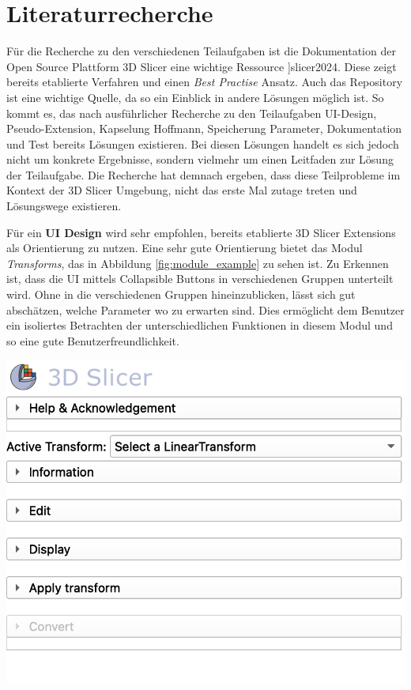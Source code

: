 \section{Literaturrecherche}
\label{sec:recherche} Für die Recherche zu den verschiedenen Teilaufgaben ist
die Dokumentation der Open Source Plattform 3D Slicer eine wichtige Ressource
\cite[vgl.]{[}]{slicer2024}. Diese zeigt bereits etablierte Verfahren und einen \textit{Best
Practise} Ansatz. Auch das \citet{extensionsIndex2024} Repository ist eine
wichtige Quelle, da so ein Einblick in andere Lösungen möglich ist. So kommt es,
das nach ausführlicher Recherche zu den Teilaufgaben UI-Design, Pseudo-Extension,
Kapselung Hoffmann, Speicherung Parameter, Dokumentation und Test bereits Lösungen
existieren. Bei diesen Lösungen handelt es sich jedoch nicht um konkrete
Ergebnisse, sondern vielmehr um einen Leitfaden zur Lösung der Teilaufgabe. Die
Recherche hat demnach ergeben, dass diese Teilprobleme im Kontext der 3D Slicer Umgebung,
nicht das erste Mal zutage treten und Lösungswege existieren.

\begin{minipage}{0.40\textwidth}
	Für ein \textbf{UI Design} wird sehr empfohlen, bereits etablierte 3D Slicer Extensions
	als Orientierung zu nutzen. Eine sehr gute Orientierung bietet das Modul
	\textit{Transforms}, das in Abbildung \ref{fig:module_example} zu sehen ist. Zu
	Erkennen ist, dass die UI mittels Collapsible Buttons in verschiedenen Gruppen
	unterteilt wird. Ohne in die verschiedenen Gruppen hineinzublicken, lässt sich
	gut abschätzen, welche Parameter wo zu erwarten sind. Dies ermöglicht dem
	Benutzer ein isoliertes Betrachten der unterschiedlichen Funktionen in diesem
	Modul und so eine gute Benutzerfreundlichkeit.
\end{minipage}
\hfill
\begin{minipage}{0.50\textwidth}
	\centering
	\includegraphics[scale=0.50]{img/modul_example.jpg}
	\label{fig:module_example}
\end{minipage}

